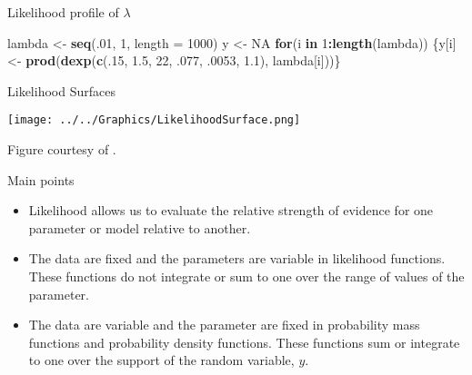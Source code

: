 \documentclass[ignorenonframetext,]{beamer}
\newenvironment{Shaded}{\begin{snugshade}}{\end{snugshade}}
\newcommand{\KeywordTok}[1]{\textcolor[rgb]{0.13,0.29,0.53}{\textbf{#1}}}
\newcommand{\DataTypeTok}[1]{\textcolor[rgb]{0.13,0.29,0.53}{#1}}
\newcommand{\DecValTok}[1]{\textcolor[rgb]{0.00,0.00,0.81}{#1}}
\newcommand{\FloatTok}[1]{\textcolor[rgb]{0.00,0.00,0.81}{#1}}
\newcommand{\StringTok}[1]{\textcolor[rgb]{0.31,0.60,0.02}{#1}}
\newcommand{\OtherTok}[1]{\textcolor[rgb]{0.56,0.35,0.01}{#1}}
\newcommand{\ControlFlowTok}[1]{\textcolor[rgb]{0.13,0.29,0.53}{\textbf{#1}}}
\newcommand{\OperatorTok}[1]{\textcolor[rgb]{0.81,0.36,0.00}{\textbf{#1}}}
\newcommand{\NormalTok}[1]{#1}
\providecommand{\tightlist}{%
  \setlength{\itemsep}{0pt}\setlength{\parskip}{0pt}}
\begin{document}
\begin{frame}[fragile]{Likelihood profile of \(\lambda\)}

\begin{center}

\end{center}

\tiny

\begin{Shaded}
\begin{Highlighting}[]
\NormalTok{lambda <-}\StringTok{ }\KeywordTok{seq}\NormalTok{(.}\DecValTok{01}\NormalTok{, }\DecValTok{1}\NormalTok{, }\DataTypeTok{length =} \DecValTok{1000}\NormalTok{)}
\NormalTok{y <-}\StringTok{ }\OtherTok{NA}
\ControlFlowTok{for}\NormalTok{(i }\ControlFlowTok{in} \DecValTok{1}\OperatorTok{:}\KeywordTok{length}\NormalTok{(lambda)) \{y[i] <-}\StringTok{ }\KeywordTok{prod}\NormalTok{(}\KeywordTok{dexp}\NormalTok{(}\KeywordTok{c}\NormalTok{(.}\DecValTok{15}\NormalTok{, }\FloatTok{1.5}\NormalTok{, }\DecValTok{22}\NormalTok{, .}\DecValTok{077}\NormalTok{, .}\DecValTok{0053}\NormalTok{, }\FloatTok{1.1}\NormalTok{), lambda[i]))\}}
\end{Highlighting}
\end{Shaded}

\end{frame}

\begin{frame}{Likelihood Surfaces}

\centerline{\texttt{[image: ../../Graphics/LikelihoodSurface.png]}}

\vspace*{1cm}

Figure courtesy of
\href{http://nesterko.com/lectures/stat221-2012/lecture8/\#/6}{}.

\end{frame}

\begin{frame}{Main points}

\begin{itemize}
\tightlist
\item
  Likelihood allows us to evaluate the relative strength of evidence for
  one parameter or model relative to another.
\item
  The data are fixed and the parameters are variable in likelihood
  functions. These functions do not integrate or sum to one over the
  range of values of the parameter.
\item
  The data are variable and the parameter are fixed in probability mass
  functions and probability density functions. These functions sum or
  integrate to one over the support of the random variable, \(y\).
\end{itemize}

\end{frame}
\end{document}
